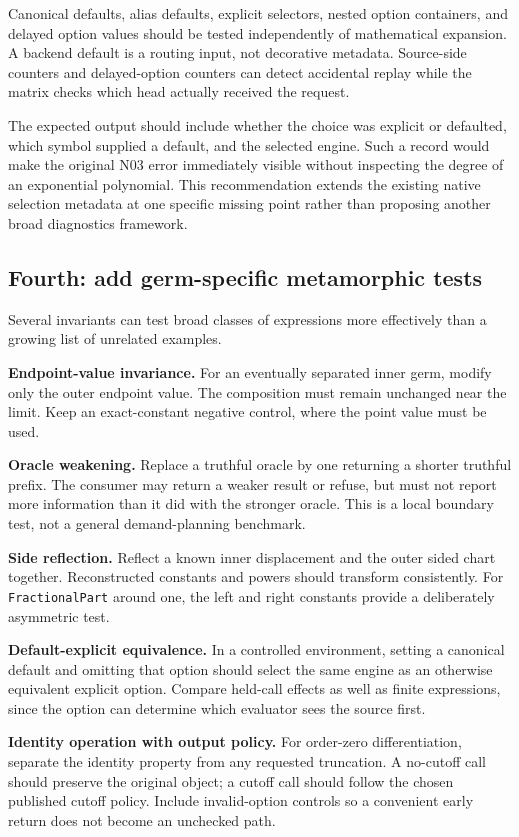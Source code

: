 \documentclass[11pt,letterpaper]{article}
\newcommand{\code}[1]{\nolinkurl{#1}}
\begin{document}
Canonical defaults, alias defaults, explicit selectors, nested option containers,
and delayed option values should be tested independently of mathematical
expansion. A backend default is a routing input, not decorative metadata.
Source-side counters and delayed-option counters can detect accidental replay
while the matrix checks which head actually received the request.

The expected output should include whether the choice was explicit or defaulted,
which symbol supplied a default, and the selected engine. Such a record would
make the original N03 error immediately visible without inspecting the degree
of an exponential polynomial. This recommendation extends the existing native
selection metadata at one specific missing point rather than proposing another
broad diagnostics framework.

\subsection{Fourth: add germ-specific metamorphic tests}
Several invariants can test broad classes of expressions more effectively than
a growing list of unrelated examples.

\textbf{Endpoint-value invariance.} For an eventually separated inner germ,
modify only the outer endpoint value. The composition must remain unchanged
near the limit. Keep an exact-constant negative control, where the point value
must be used.

\textbf{Oracle weakening.} Replace a truthful oracle by one returning a shorter
truthful prefix. The consumer may return a weaker result or refuse, but must
not report more information than it did with the stronger oracle. This is a
local boundary test, not a general demand-planning benchmark.

\textbf{Side reflection.} Reflect a known inner displacement and the outer sided
chart together. Reconstructed constants and powers should transform
consistently. For \code{FractionalPart} around one, the left and right constants
provide a deliberately asymmetric test.

\textbf{Default-explicit equivalence.} In a controlled environment, setting a
canonical default and omitting that option should select the same engine as an
otherwise equivalent explicit option. Compare held-call effects as well as
finite expressions, since the option can determine which evaluator sees the
source first.

\textbf{Identity operation with output policy.} For order-zero differentiation,
separate the identity property from any requested truncation. A no-cutoff call
should preserve the original object; a cutoff call should follow the chosen
published cutoff policy. Include invalid-option controls so a convenient early
return does not become an unchecked path.
\end{document}
